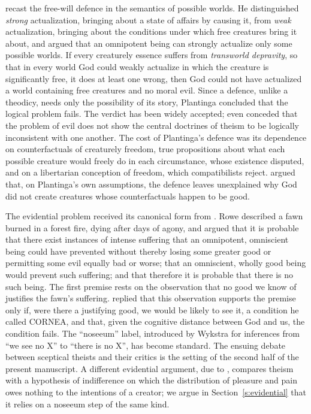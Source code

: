 \documentclass{situationist-preprint}
\begin{document}
\citet{Plantinga1974,Plantinga1974a} recast the free-will defence in the semantics of possible worlds. He distinguished \emph{strong} actualization, bringing about a state of affairs by causing it, from \emph{weak} actualization, bringing about the conditions under which free creatures bring it about, and argued that an omnipotent being can strongly actualize only some possible worlds. If every creaturely essence suffers from \emph{transworld depravity}, so that in every world God could weakly actualize in which the creature is significantly free, it does at least one wrong, then God could not have actualized a world containing free creatures and no moral evil. Since a defence, unlike a theodicy, needs only the possibility of its story, Plantinga concluded that the logical problem fails. The verdict has been widely accepted; even \citet[154]{Mackie1982} conceded that the problem of evil does not show the central doctrines of theism to be logically inconsistent with one another. The cost of Plantinga's defence was its dependence on counterfactuals of creaturely freedom, true propositions about what each possible creature would freely do in each circumstance, whose existence \citet{Adams1977} disputed, and on a libertarian conception of freedom, which compatibilists reject. \citet{Lewis1993} argued that, on Plantinga's own assumptions, the defence leaves unexplained why God did not create creatures whose counterfactuals happen to be good.

The evidential problem received its canonical form from \citet{Rowe1979}. Rowe described a fawn burned in a forest fire, dying after days of agony, and argued that it is probable that there exist instances of intense suffering that an omnipotent, omniscient being could have prevented without thereby losing some greater good or permitting some evil equally bad or worse; that an omniscient, wholly good being would prevent such suffering; and that therefore it is probable that there is no such being. The first premise rests on the observation that no good we know of justifies the fawn's suffering. \citet{Wykstra1984} replied that this observation supports the premise only if, were there a justifying good, we would be likely to see it, a condition he called CORNEA, and that, given the cognitive distance between God and us, the condition fails. The \enquote{noseeum} label, introduced by Wykstra for inferences from \enquote{we see no X} to \enquote{there is no X}, has become standard. The ensuing debate between sceptical theists and their critics \citep{Bergmann2001,AlmeidaOppy2003,BergmannRea2005} is the setting of the second half of the present manuscript. A different evidential argument, due to \citet{Draper1989}, compares theism with a hypothesis of indifference on which the distribution of pleasure and pain owes nothing to the intentions of a creator; we argue in Section~\ref{s:evidential} that it relies on a noseeum step of the same kind.
\end{document}
